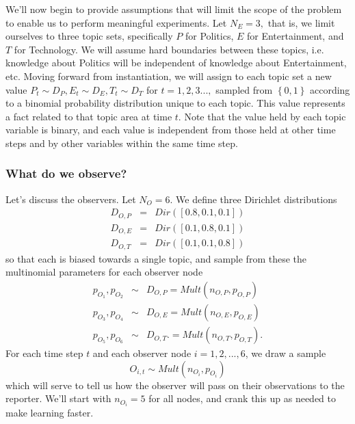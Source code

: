 \documentclass{amsart}
\theoremstyle{definition}
\theoremstyle{plain}
\numberwithin{equation}{section}
\begin{document}
We'll now begin to provide assumptions that will limit the scope of the
problem to enable us to perform meaningful experiments. Let $N_{E}=3,$ that
is, we limit ourselves to three topic sets, specifically $P$ for Politics, $E
$ for Entertainment, and $T$ for Technology. We will assume hard boundaries
between these topics, i.e. knowledge about Politics will be independent of
knowledge about Entertainment, etc. Moving forward from instantiation, we
will assign to each topic set a new value $P_{t}\sim D_{P},E_{t}\sim
D_{E},T_{t}\sim D_{T}$ for $t=1,2,3...,$ sampled from $\left\{ 0,1\right\} $
according to a binomial probability distribution unique to each topic. This
value represents a fact related to that topic area at time $t$. Note that
the value held by each topic variable is binary, and each value is
independent from those held at other time steps and by other variables
within the same time step.

\subsubsection{What do we observe?}

Let's discuss the observers. Let $N_{O}=6$. We define three Dirichlet
distributions 
\begin{eqnarray*}
D_{O,P} &=&Dir\left( \left[ 0.8,0.1,0.1\right] \right)  \\
D_{O,E} &=&Dir\left( \left[ 0.1,0.8,0.1\right] \right)  \\
D_{O,T} &=&Dir\left( \left[ 0.1,0.1,0.8\right] \right) 
\end{eqnarray*}%
so that each is biased towards a single topic, and sample from these the
multinomial parameters for each observer node 
\begin{eqnarray*}
p_{O_{1}},p_{O_{2}} &\sim &D_{O,P}=Mult\left( n_{O,P},p_{O,P}\right)  \\
p_{O_{3}},p_{O_{4}} &\sim &D_{O,E}=Mult\left( n_{O,E},p_{O,E}\right)  \\
p_{O_{5}},p_{O_{6}} &\sim &D_{O,T}.=Mult\left( n_{O,T},p_{O,T}\right) .
\end{eqnarray*}%
For each time step $t$ and each observer node $i=1,2,...,6$, we draw a sample%
\begin{equation*}
O_{i,t}\sim Mult\left( n_{O_{i}},p_{O_{i}}\right) 
\end{equation*}%
which will serve to tell us how the observer will pass on their observations
to the reporter. We'll start with $n_{O_{i}}=5$ for all nodes, and crank
this up as needed to make learning faster. 
\end{document}
